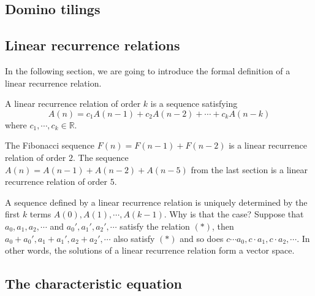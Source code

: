 \subsection{Domino tilings}

\subsection{Linear recurrence relations}

In the following section, we are going to introduce the formal definition of a linear recurrence relation.

\begin{defn}
A linear recurrence relation of order $k$ is a sequence satisfying 
$$
A(n)=c_1A(n-1)+c_2A(n-2)+\cdots+c_kA(n-k)
$$
where $c_1,\cdots, c_k \in \mathbb{R}$.
\label{defn:rec}
\end{defn}

\begin{exmp}
The Fibonacci sequence $F(n)=F(n-1)+F(n-2)$ is a linear recurrence relation of order $2$. The sequence
$A(n)=A(n-1)+A(n-2)+A(n-5)$ from the last section is a linear recurrence relation of order $5$.
\end{exmp}

\begin{remark}
A sequence defined by a linear recurrence relation is uniquely determined by the first $k$ terms $A(0), A(1), \cdots, A(k-1)$.
Why is that the case? Suppose that $a_0, a_1, a_2, \cdots$ and $a_0', a_1', a_2', \cdots$ satisfy the relation $(*)$,
then $a_0+a_0', a_1+a_1',a_2+a_2', \cdots$ also satisfy $(*)$ and so does $c \cdots a_0, c \cdot a_1, c \cdot a_2, \cdots$.
In other words, the solutions of a linear recurrence relation form a vector space.
\end{remark}

\subsection[The characteristic equation]{The characteristic equation}

